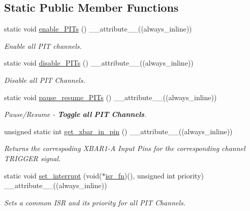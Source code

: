 \subsection*{Static Public Member Functions}
\begin{DoxyCompactItemize}
\item 
static void \hyperlink{classPITController_aa742977692efbc075b52a5dbd6533230}{enable\+\_\+\+P\+I\+Ts} () \+\_\+\+\_\+attribute\+\_\+\+\_\+((always\+\_\+inline))
\begin{DoxyCompactList}\small\item\em Enable all P\+IT channels. \end{DoxyCompactList}\item 
static void \hyperlink{classPITController_a5e1bf9f8053a51c68f0ff2178ab56954}{disable\+\_\+\+P\+I\+Ts} () \+\_\+\+\_\+attribute\+\_\+\+\_\+((always\+\_\+inline))
\begin{DoxyCompactList}\small\item\em Disable all P\+IT Channels. \end{DoxyCompactList}\item 
static void \hyperlink{classPITController_a24b7ea02555967ef945ab87aae338574}{pause\+\_\+resume\+\_\+\+P\+I\+Ts} () \+\_\+\+\_\+attribute\+\_\+\+\_\+((always\+\_\+inline))
\begin{DoxyCompactList}\small\item\em Pause/\+Resume -\/ {\bfseries Toggle} {\bfseries all} {\bfseries P\+IT} {\bfseries Channels}. \end{DoxyCompactList}\item 
unsigned static int \hyperlink{classPITController_a7cb352b2deb5bba48b8e2f0671a66801}{get\+\_\+xbar\+\_\+in\+\_\+pin} () \+\_\+\+\_\+attribute\+\_\+\+\_\+((always\+\_\+inline))
\begin{DoxyCompactList}\small\item\em Returns the correspoding X\+B\+A\+R1-\/A Input Pins for the corresponding channel T\+R\+I\+G\+G\+ER signal. \end{DoxyCompactList}\item 
static void \hyperlink{classPITController_aa94b6dc081d453c8dda54c3ade4b3d94}{set\+\_\+interrupt} (void($\ast$\hyperlink{main_8cpp_a4fc8f622f69a856a51bd3d4b1b42233a}{isr\+\_\+fn})(), unsigned int priority) \+\_\+\+\_\+attribute\+\_\+\+\_\+((always\+\_\+inline))
\begin{DoxyCompactList}\small\item\em Sets a common I\+SR and its priority for all P\+IT Channels. \end{DoxyCompactList}\end{DoxyCompactItemize}
